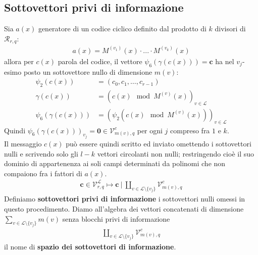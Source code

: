 \subsection{Sottovettori privi di informazione}
Sia $a(x)$ generatore di un codice ciclico definito dal prodotto di $k$ divisori di $\mathcal{R}_{r,q}$:
\begin{align*}
   a(x) = M^{(v_{1})}(x)\cdot ... \cdot M^{(v_{k})}(x)
\end{align*}
allora per $c(x)$ parola del codice, il vettore $\psi_{6}(\gamma (c(x))) = \mathbf{c}$ ha nel $v_{j}$-esimo posto un sottovettore nullo di dimensione $m(v)$:
\begin{align*}
   \psi_{2}(c(x)) &= (c_{0},c_{1}, \dots, c_{r-1}) \\
   \gamma(c(x)) &= ( c(x) \mod{M^{(v)} (x)} )_{v \in \mathscr{L} } \\
   \psi_{6}(\gamma (c(x))) &= (\psi_{2}(c(x) \mod{M^{(v)} (x)}))_{v \in \mathscr{L} } 
\end{align*}
Quindi $\psi_{6}(\gamma (c(x)))_{v_{j}} = \mathbf{0} \in \mathcal{V}_{m(v), q}^{c}$ per ogni $j$ compreso fra $1$ e $k$.\\
Il messaggio $c(x)$ può essere quindi scritto ed inviato omettendo i sottovettori nulli e scrivendo solo gli $l - k$ vettori circolanti non nulli; restringendo cioè il suo dominio di appartenenza ai soli campi determinati da polinomi che non compaiono fra i fattori di $a(x)$.
\begin{align*}
   \mathbf{c} \in \mathcal{V}_{r, q}^{\mathscr{L}} 
   \mapsto 
   \mathbf{c} ~ \Bigg|~ \coprod_{v\in \mathscr{L} \setminus \lbrace v_{j}\rbrace} \mathcal{V}_{m(v), q}^{c}
\end{align*}
Definiamo {\bf sottovettori privi di informazione} i sottovettori nulli omessi in questo procedimento. Diamo all'algebra dei vettori concatenati di dimensione $\sum_{v\in \mathscr{L} \setminus \lbrace v_{j}\rbrace} m(v)$ senza blocchi privi di informazione
\begin{align*}
   \coprod_{v\in \mathscr{L} \setminus \lbrace v_{j}\rbrace} \mathcal{V}_{m(v), q}^{c}
\end{align*}
il nome di {\bf spazio dei sottovettori di informazione}.


